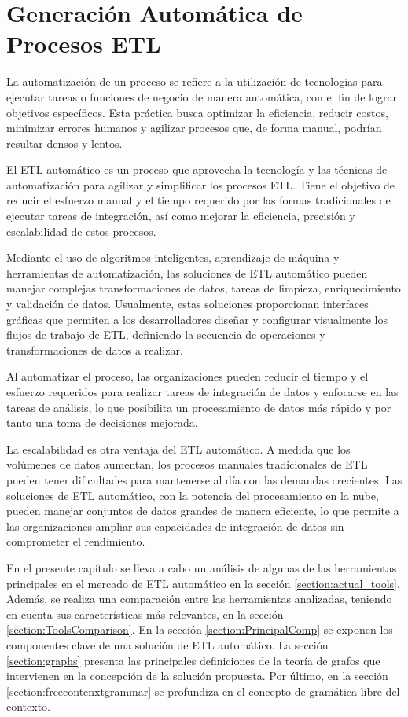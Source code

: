 \chapter{Generaci\'on Autom\'atica de Procesos ETL}\label{chapter:auto-etl}

La automatización de un proceso se refiere a la utilización de tecnologías para ejecutar tareas o funciones de 
negocio de manera automática, con el fin de lograr objetivos 
específicos. Esta práctica busca optimizar la eficiencia, reducir costos, minimizar errores humanos y agilizar 
procesos que, de forma manual, podrían resultar densos y lentos.

El ETL automático es un proceso que 
aprovecha la tecnología y las técnicas de automatización para agilizar y simplificar los procesos ETL. Tiene el objetivo 
de reducir el esfuerzo manual y el tiempo requerido por las formas tradicionales de ejecutar tareas de integración, 
as\'i como mejorar la eficiencia, precisión y escalabilidad de estos procesos.

Mediante el uso de algoritmos inteligentes, aprendizaje de m\'aquina y herramientas de automatización, las soluciones de 
ETL automático pueden manejar complejas transformaciones de datos, tareas de limpieza, enriquecimiento 
y validación de datos. Usualmente, estas soluciones proporcionan interfaces gráficas que permiten a los 
desarrolladores diseñar y configurar visualmente los flujos de trabajo de ETL, definiendo la secuencia de operaciones y 
transformaciones de datos a realizar.

Al automatizar el proceso, las 
organizaciones pueden reducir el tiempo y el esfuerzo requeridos para realizar tareas de integración de 
datos y enfocarse en las tareas de an\'alisis, lo que posibilita un procesamiento de datos más rápido y 
por tanto una toma de decisiones mejorada.

La escalabilidad es otra ventaja del ETL automático. A medida que los volúmenes de datos aumentan, los procesos manuales 
tradicionales de ETL pueden tener dificultades para mantenerse al día con las demandas crecientes. Las soluciones de ETL 
automático, con la potencia del procesamiento en la nube, pueden manejar conjuntos de datos grandes de manera eficiente, 
lo que permite a las organizaciones ampliar sus capacidades de integración de datos sin comprometer el rendimiento.

En el presente cap\'itulo se lleva a cabo un análisis de algunas de las herramientas principales en el 
mercado de ETL automático en la sección \ref{section:actual_tools}. Además, se realiza una comparación entre las 
herramientas analizadas, teniendo en cuenta sus características más relevantes, en la sección 
\ref{section:ToolsComparison}. En la sección \ref{section:PrincipalComp} se exponen los componentes clave de 
una solución de ETL automático. La sección \ref{section:graphs} presenta las principales definiciones de la 
teoría de grafos que intervienen en la concepción de la solución propuesta. Por \'ultimo, en la sección 
\ref{section:freecontenxtgrammar} se profundiza en el concepto de gramática libre del contexto.



